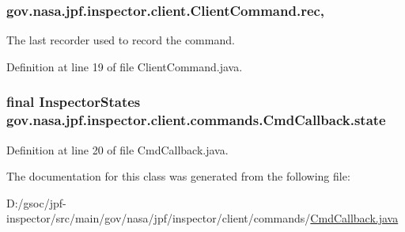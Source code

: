 \subsubsection[{\texorpdfstring{rec}{rec}}]{ gov.\+nasa.\+jpf.\+inspector.\+client.\+Client\+Command.\+rec\hspace{0.3cm}{\ttfamily [protected]}, {\ttfamily [inherited]}}\hypertarget{classgov_1_1nasa_1_1jpf_1_1inspector_1_1client_1_1_client_command_af4246f2427035c72a6af45a2c61361f7}{}\label{classgov_1_1nasa_1_1jpf_1_1inspector_1_1client_1_1_client_command_af4246f2427035c72a6af45a2c61361f7}


The last recorder used to record the command. 



Definition at line 19 of file Client\+Command.\+java.

\subsubsection[{\texorpdfstring{state}{state}}]{\setlength{\rightskip}{0pt plus 5cm}final {\bf Inspector\+States} gov.\+nasa.\+jpf.\+inspector.\+client.\+commands.\+Cmd\+Callback.\+state\hspace{0.3cm}{\ttfamily [private]}}\hypertarget{classgov_1_1nasa_1_1jpf_1_1inspector_1_1client_1_1commands_1_1_cmd_callback_a565db0f21a577f23952aaa47706b7cbd}{}\label{classgov_1_1nasa_1_1jpf_1_1inspector_1_1client_1_1commands_1_1_cmd_callback_a565db0f21a577f23952aaa47706b7cbd}


Definition at line 20 of file Cmd\+Callback.\+java.



The documentation for this class was generated from the following file\+:\begin{DoxyCompactItemize}
\item 
D\+:/gsoc/jpf-\/inspector/src/main/gov/nasa/jpf/inspector/client/commands/\hyperlink{_cmd_callback_8java}{Cmd\+Callback.\+java}\end{DoxyCompactItemize}
